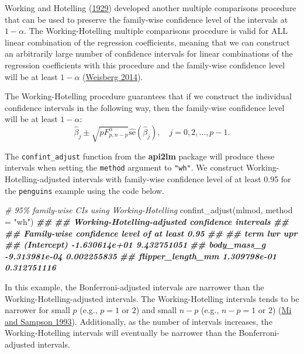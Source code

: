 \documentclass[
]{book}
\newenvironment{Shaded}{\begin{snugshade}}{\end{snugshade}}
\newcommand{\AttributeTok}[1]{\textcolor[rgb]{0.77,0.63,0.00}{#1}}
\newcommand{\CommentTok}[1]{\textcolor[rgb]{0.56,0.35,0.01}{\textit{#1}}}
\newcommand{\DocumentationTok}[1]{\textcolor[rgb]{0.56,0.35,0.01}{\textbf{\textit{#1}}}}
\newcommand{\FunctionTok}[1]{\textcolor[rgb]{0.00,0.00,0.00}{#1}}
\newcommand{\NormalTok}[1]{#1}
\newcommand{\StringTok}[1]{\textcolor[rgb]{0.31,0.60,0.02}{#1}}
\theoremstyle{definition}
\theoremstyle{definition}
\theoremstyle{definition}
\theoremstyle{definition}
\theoremstyle{remark}
\begin{document}
Working and Hotelling (\protect\hyperlink{ref-workinghotelling}{1929}) developed another multiple comparisons procedure that can be used to preserve the family-wise confidence level of the intervals at \(1-\alpha\). The Working-Hotelling multiple comparisons procedure is valid for ALL linear combination of the regression coefficients, meaning that we can construct an arbitrarily large number of confidence intervals for linear combinations of the regression coefficients with this procedure and the family-wise confidence level will be at least \(1-\alpha\) (\protect\hyperlink{ref-alr4}{Weisberg 2014}).

The Working-Hotelling procedure guarantees that if we construct the individual confidence intervals in the following way, then the family-wise confidence level will be at least \(1-\alpha\):
\[
\hat{\beta}_j \pm \sqrt{p F^\alpha_{p,n-p}} \hat{\mathrm{se}}(\hat{\beta}_j),\quad j=0,2,\ldots,p-1. \label{eq:wh-ci-betas}
\]

The \texttt{confint\_adjust} function from the \textbf{api2lm} package will produce these intervals when setting the \texttt{method} argument to \texttt{"wh"}. We construct Working-Hotelling-adjusted intervals with family-wise confidence level of at least 0.95 for the \texttt{penguins} example using the
code below.

\begin{Shaded}
\begin{Highlighting}[]
\CommentTok{\# 95\% family{-}wise CIs using Working{-}Hotelling}
\FunctionTok{confint\_adjust}\NormalTok{(mlmod, }\AttributeTok{method =} \StringTok{"wh"}\NormalTok{)}
\DocumentationTok{\#\# }
\DocumentationTok{\#\# Working{-}Hotelling{-}adjusted confidence intervals}
\DocumentationTok{\#\# }
\DocumentationTok{\#\# Family{-}wise confidence level of at least 0.95 }
\DocumentationTok{\#\# }
\DocumentationTok{\#\#               term           lwr         upr}
\DocumentationTok{\#\#        (Intercept) {-}1.630614e+01 9.432751051}
\DocumentationTok{\#\#        body\_mass\_g {-}9.313981e{-}04 0.002255835}
\DocumentationTok{\#\#  flipper\_length\_mm  1.309798e{-}01 0.312751116}
\end{Highlighting}
\end{Shaded}

In this example, the Bonferroni-adjusted intervals are narrower than the Working-Hotelling-adjusted intervals. The Working-Hotelling intervals tends to be narrower for small \(p\) (e.g., \(p=1\) or \(2\)) and small \(n-p\) (e.g., \(n-p = 1\) or \(2\)) (\protect\hyperlink{ref-bon_vs_scheffe}{Mi and Sampson 1993}). Additionally, as the number of intervals increases, the Working-Hotelling intervals will eventually be narrower than the Bonferroni-adjusted intervals.
\end{document}
